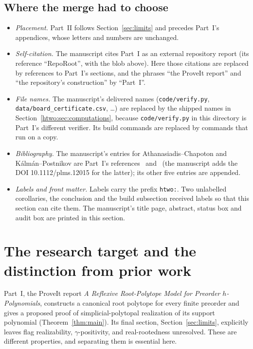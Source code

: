 \documentclass[11pt]{article}
\numberwithin{equation}{section}
\theoremstyle{definition}
\begin{document}
\subsection{Where the merge had to choose}
\label{htwo:sec:merge}
\begin{itemize}[leftmargin=1.4em]
\item \emph{Placement.} Part~II follows Section~\ref{sec:limits} and precedes
Part~I's appendices, whose letters and numbers are unchanged.
\item \emph{Self-citation.} The manuscript cites Part~I as an external
repository report (its reference ``RepoRoot'', with the blob above). Here
those citations are replaced by references to Part~I's sections, and the
phrases ``the ProveIt report'' and ``the repository's construction'' by
``Part~I''.
\item \emph{File names.} The manuscript's delivered names
(\texttt{code/verify.py}, \nolinkurl{data/board_certificate.csv}, \dots) are
replaced by the shipped names in Section~\ref{htwo:sec:computations}, because
\texttt{code/verify.py} in this directory is Part~I's different verifier. Its
build commands are replaced by commands that run on a copy.
\item \emph{Bibliography.} The manuscript's entries for Athanasiadis--Chapoton
and K\'alm\'an--Postnikov are Part~I's references~\cite{AC} and~\cite{KP} (the
manuscript adds the DOI 10.1112/plms.12015 for the latter); its other five
entries are appended.
\item \emph{Labels and front matter.} Labels carry the prefix
\texttt{htwo:}. Two unlabelled corollaries, the conclusion and the build
subsection received labels so that this section can cite them. The manuscript's title page, abstract, status box and
audit box are printed in this section.
\end{itemize}

\section{The research target and the distinction from prior work}\label{htwo:sec:target}

Part~I, the ProveIt report \emph{A Reflexive Root-Polytope Model for Preorder
$h$-Polynomials}, constructs a canonical root polytope for every finite
preorder and gives a proposed proof of simplicial-polytopal realization of
its support polynomial (Theorem~\ref{thm:main}). Its final section,
Section~\ref{sec:limits}, explicitly leaves
flag realizability, $\gamma$-positivity, and real-rootedness unresolved. These
are different properties, and separating them is essential here.
\end{document}
